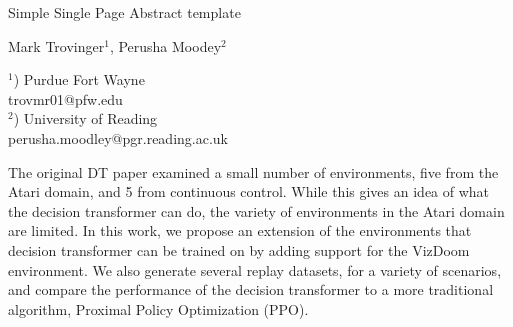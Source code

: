 \documentclass[a4paper]{article}
\begin{document}

\Large
 \begin{center}
Simple Single Page Abstract template\\ 

\hspace{10pt}

\large
Mark Trovinger$^1$, Perusha Moodey$^2$ \\

\hspace{10pt}

\small  
$^1$) Purdue Fort Wayne\\
trovmr01@pfw.edu\\
$^2$) University of Reading\\
perusha.moodley@pgr.reading.ac.uk\\

\end{center}

\hspace{10pt}

\normalsize

The original DT paper examined a small number of environments, five from the Atari domain, and 5 from continuous control. While this gives an idea of what the decision transformer can do, the variety of environments in the Atari domain are limited. In this work, we propose an extension of the environments that decision transformer can be trained on by adding support for the VizDoom environment. We also generate several replay datasets, for a variety of scenarios, and compare the performance of the decision transformer to a more traditional algorithm, Proximal Policy Optimization (PPO). 
\end{document}
